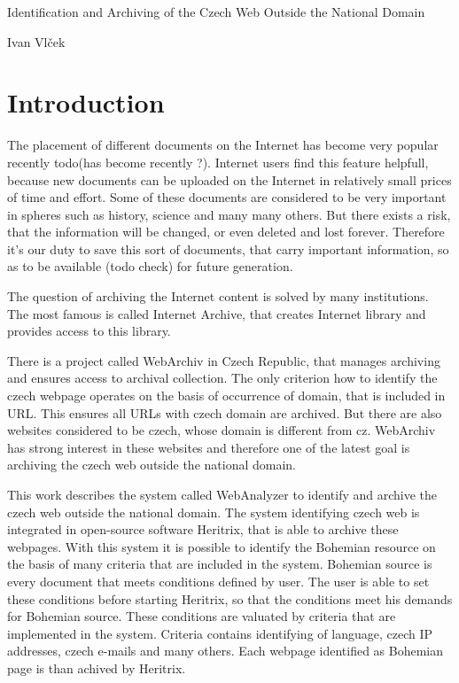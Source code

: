 \documentclass[11pt,a4paper]{article}
\begin{document}
\begin{center}
{\huge Identification and Archiving of the Czech Web Outside the National Domain}

\vspace{3.2em}

{\LARGE Ivan Vlček}

\newpage
\tableofcontents

\end{center}
\newpage


\newpage
\section{Introduction}

The placement of different documents on the Internet has become very popular recently todo(has become recently ?). Internet users find this feature helpfull, because new documents can be uploaded on the Internet in relatively small prices of time and effort.  Some of these documents are considered to be very important in spheres such as history, science and many many others. But there exists a risk, that the information will be changed, or even deleted and lost forever. Therefore it's our duty to save this sort of documents, that carry important information, so as to be available (todo check) for future generation.

The question of archiving the Internet content is solved by many institutions. The most famous is called Internet Archive, that creates Internet library and provides access to this library.

There is a project called WebArchiv in Czech Republic, that manages archiving and ensures access to archival collection. The only criterion how to identify the czech webpage operates on the basis of occurrence of domain, that is included in URL. This ensures all URLs with czech domain are archived. But there are also websites considered to be czech, whose domain is different from cz. WebArchiv has strong interest in these websites and therefore one of the latest goal is archiving the czech web outside the national domain.

This work describes the system called WebAnalyzer to identify and archive the czech web outside the national domain. The system identifying czech web is integrated in open-source software Heritrix, that is able to archive these webpages. With this system it is possible to identify the Bohemian resource on the basis of many criteria that are included in the system. Bohemian source is every document that meets conditions defined by user. The user is able to set these conditions before starting Heritrix, so that the conditions meet his demands for Bohemian source. These conditions are valuated by criteria that are implemented in the system. Criteria contains identifying of language, czech IP addresses, czech e-mails and many others. Each webpage identified as Bohemian page is than achived by Heritrix.
\end{document}
